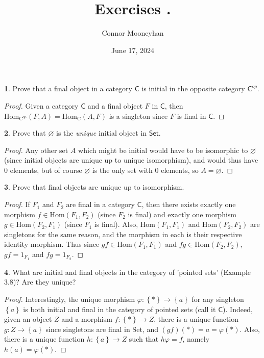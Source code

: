 \documentclass{article}
\title{Exercises {\Roman{chapter}}.{\arabic{section}}}
\author{Connor Mooneyhan}
\date{June 17, 2024}
\theoremstyle{definition}
\newtheorem{ex}{}[section]
\begin{document}
\maketitle

\begin{ex}
	Prove that a final object in a category $\mathsf{C}$ is initial in the opposite category $\mathsf{C}^{op}$.
\end{ex}
\begin{proof}
	Given a category $\mathsf{C}$ and a final object $F$ in $\mathsf{C}$, then $\mathrm{Hom}_{\mathrm{C^{op}}}(F, A) =\mathrm{Hom}_{\mathrm{C}}(A, F)$ is a singleton since $F$ is final in $\mathsf{C}$.
\end{proof}

\begin{ex}
	Prove that $\varnothing$ is the \textit{unique} initial object in $\mathsf{Set}$.
\end{ex}
\begin{proof}
	Any other set $A$ which might be initial would have to be isomorphic to $\varnothing$ (since initial objects are unique up to unique isomorphism), and would thus have 0 elements, but of course $\varnothing$ is the only set with $0$ elements, so $A = \varnothing$.
\end{proof}

\begin{ex}
	Prove that final objects are unique up to isomorphism.
\end{ex}
\begin{proof}
	If $F_1$ and $F_2$ are final in a category $\mathsf{C}$, then there exists exactly one morphism $f \in \mathrm{Hom}(F_1, F_2)$ (since $F_2$ is final) and exactly one morphism $g \in \mathrm{Hom}(F_2, F_1)$ (since $F_1$ is final).
	Also, $\mathrm{Hom}(F_1, F_1)$ and $\mathrm{Hom}(F_2, F_2)$ are singletons for the same reason, and the morphism in each is their respective identity morphism.
	Thus since $gf \in \mathrm{Hom}(F_1, F_1)$ and $fg \in \mathrm{Hom}(F_2, F_2)$, $gf = 1_{F_1}$ and $fg = 1_{F_2}$.
\end{proof}

\begin{ex}
	What are initial and final objects in the category of 'pointed sets' (Example 3.8)?
	Are they unique?
\end{ex}
\begin{proof}
	Interestingly, the unique morphism $\varphi: \left\lbrace * \right\rbrace \to \left\lbrace a \right\rbrace$ for any singleton $\left\lbrace a \right\rbrace$ is both initial and final in the category of pointed sets (call it $\mathsf{C}$).
	Indeed, given an object $Z$ and a morphism $f: \left\lbrace * \right\rbrace \to Z$, there is a unique function $g: Z \to \left\lbrace a \right\rbrace$ since singletons are final in $\mathrm{Set}$, and $(gf)(*) = a = \varphi(*)$.
	Also, there is a unique function $h: \left\lbrace a \right\rbrace \to Z$ such that $h\varphi = f$, namely $h(a) = \varphi(*)$.
\end{proof}
\end{document}
